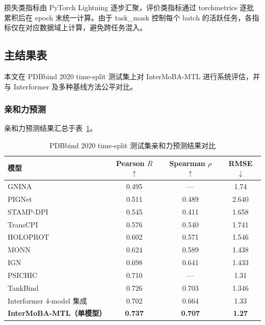 损失类指标由 PyTorch Lightning 逐步汇聚，评价类指标通过 torchmetrics 逐批累积后在 epoch 末统一计算。由于 task\_mask 控制每个 batch 的活跃任务，各指标仅在对应数据域上计算，避免跨任务混入。

\subsection{主结果表}

本文在 PDBbind 2020 time-split 测试集上对 InterMoBA-MTL 进行系统评估，并与 Interformer\cite{lai2024interformer} 及多种基线方法公平对比。

\subsubsection{亲和力预测}

亲和力预测结果汇总于表~\ref{T.affinity_results}。

\begin{table}[htb]
  \centering
  \caption{PDBbind 2020 time-split 测试集亲和力预测结果对比}
  \label{T.affinity_results}
  \footnotesize
  \setlength{\tabcolsep}{5pt}
  \renewcommand{\arraystretch}{0.92}
  \begin{tabular}{lccc}
    \toprule
    模型 & Pearson $R$ $\uparrow$ & Spearman $\rho$ $\uparrow$ & RMSE $\downarrow$ \\
    \midrule
    GNINA\cite{mcnutt2021gnina} & 0.495 & --- & 1.74 \\
    PIGNet\cite{moon2022pignet} & 0.511 & 0.489 & 2.640 \\
    STAMP-DPI\cite{zou2022stampdpi} & 0.545 & 0.411 & 1.658 \\
    TransCPI\cite{chen2020transcpi} & 0.576 & 0.540 & 1.741 \\
    HOLOPROT\cite{somnath2021holoprot} & 0.602 & 0.571 & 1.546 \\
    MONN\cite{li2020monn} & 0.624 & 0.589 & 1.438 \\
    IGN\cite{jiang2021ign} & 0.698 & 0.641 & 1.433 \\
    PSICHIC\cite{koh2024psichic} & 0.710 & --- & 1.31 \\
    TankBind\cite{lu2022tankbind} & 0.726 & 0.703 & 1.346 \\
    Interformer 4-model 集成\cite{lai2024interformer} & 0.702 & 0.664 & 1.33 \\
    \textbf{InterMoBA-MTL（单模型）} & \textbf{0.737} & \textbf{0.707} & \textbf{1.27} \\
    \bottomrule
  \end{tabular}
\end{table}

